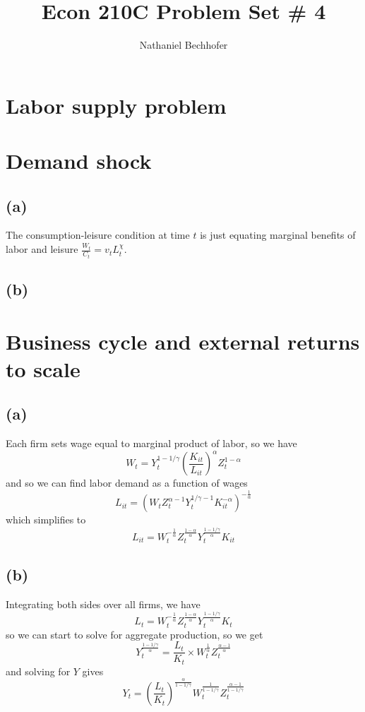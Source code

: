 \documentclass[11pt]{amsart}
\title{Econ 210C Problem Set \# 4}
\author{Nathaniel Bechhofer}
\begin{document}
\maketitle

\section{Labor supply problem}
\section{Demand shock}

\subsection*{(a)}

The consumption-leisure condition at time $t$ is just equating marginal benefits of labor and leisure $\frac{W_t}{C_t} = v_t L_t^\chi$.

\subsection*{(b)}


\section{Business cycle and external returns to scale}

\subsection*{(a)}

Each firm sets wage equal to marginal product of labor, so we have
\[
W_t = Y_t^{1-1/\gamma} \left(\frac{K_{it}}{L_{it}}\right)^{\alpha} Z_t^{1-\alpha}
\]
and so we can find labor demand as a function of wages
\[
L_{it} = (W_t Z_t^{\alpha-1} Y_t^{1/\gamma -1} K_{it}^{-\alpha})^{-\frac{1}{\alpha}}
\]
which simplifies to
\[
L_{it} = W_t^{-\frac{1}{\alpha}} Z_t^{\frac{1-\alpha}{\alpha}} Y_t^{\frac{1-1/\gamma}{\alpha}} K_{it}
\]

\subsection*{(b)}

Integrating both sides over all firms, we have
\[
L_t = W_t^{-\frac{1}{\alpha}} Z_t^{\frac{1-\alpha}{\alpha}} Y_t^{\frac{1-1/\gamma}{\alpha}} K_t
\]
so we can start to solve for aggregate production, so we get
\[
Y_t^{\frac{1-1/\gamma}{\alpha}} = \frac{L_t}{K_t} \times W_t^{\frac{1}{\alpha}} Z_t^{\frac{\alpha - 1}{\alpha}}
\]
and solving for $Y$ gives
\[
Y_t = \left(\frac{L_t}{K_t} \right)^{\frac{\alpha}{1-1/\gamma}} W_t^{\frac{1}{1-1/\gamma}} Z_t^{\frac{\alpha - 1}{1-1/\gamma}}
\]
\end{document}

